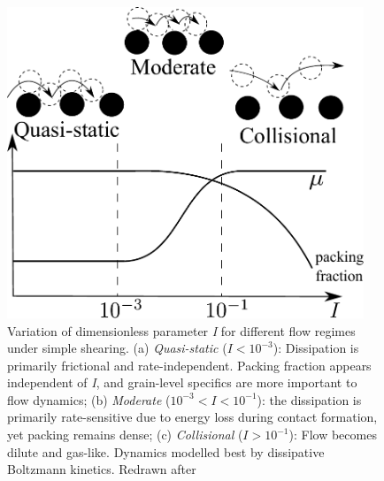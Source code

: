 \begin{figure}[tbhp]
\centering
\includegraphics[width=0.95\textwidth]{Regime}
\caption[Variation of dimensionless parameter \textit{I} for different flow 
regimes]{Variation of dimensionless parameter \textit{I} for different 
flow regimes under simple shearing. (a) \textit{Quasi-static} ($I < 10^{-3}$): 
Dissipation is primarily frictional and rate-independent. Packing fraction 
appears independent of \textit{I}, and grain-level specifics are more important 
to flow dynamics; (b) \textit{Moderate} ($10^{-3} < I < 
10^{-1}$): the dissipation is primarily rate-sensitive due to energy loss 
during contact formation, yet packing remains dense; (c) \textit{Collisional} 
($I > 10^{-1}$): Flow becomes dilute and gas-like. Dynamics modelled best by 
dissipative Boltzmann kinetics. Redrawn after~\citep{Kamrin2008}}
\label{fig:Regime}
\end{figure}


